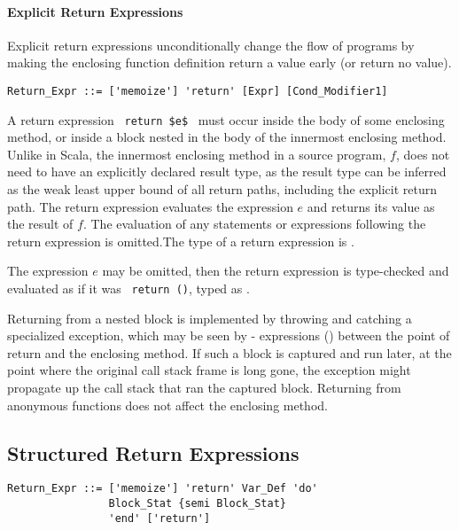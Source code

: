 \paragraph{Explicit Return Expressions}
Explicit return expressions unconditionally change the flow of programs by making the enclosing function definition return a value early (or return no value). 

\syntax\begin{lstlisting}
Return_Expr ::= ['memoize'] 'return' [Expr] [Cond_Modifier1]
\end{lstlisting}

A return expression ~\lstinline!return $e$!~ must occur inside the body of some enclosing method, or inside a block nested in the body of the innermost enclosing method. Unlike in Scala, the innermost enclosing method in a source program, $f$, does not need to have an explicitly declared result type, as the result type can be inferred as the weak least upper bound of all return paths, including the explicit return path. The return expression evaluates the expression $e$ and returns its value as the result of $f$. The evaluation of any statements or expressions following the return expression is omitted.The type of a return expression is .

The expression $e$ may be omitted, then the return expression  is type-checked and evaluated as if it was ~\lstinline!return ()!, typed as . 

Returning from a nested block is implemented by throwing and catching a specialized exception, which may be seen by - expressions () between the point of return and the enclosing method. If such a block is captured and run later, at the point where the original call stack frame is long gone, the exception might propagate up the call stack that ran the captured block. Returning from anonymous functions does not affect the enclosing method. 






\subsection{Structured Return Expressions}

\syntax\begin{lstlisting}
Return_Expr ::= ['memoize'] 'return' Var_Def 'do' 
                Block_Stat {semi Block_Stat} 
                'end' ['return']
\end{lstlisting}

